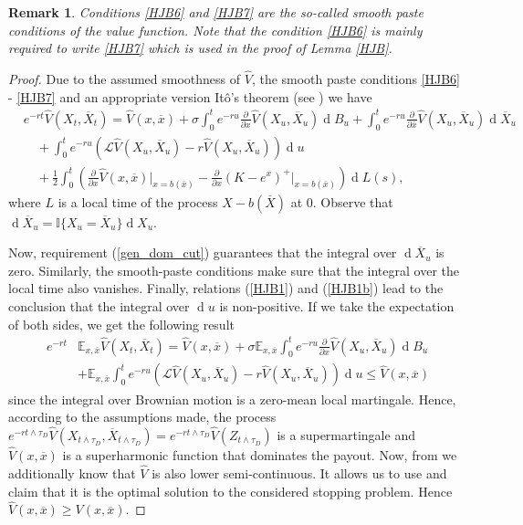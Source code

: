 \documentclass[10pt]{amsart}
\def\E{{\mathbb{E}}}
\def \R{{{\rm I{\!}\rm R}}}
\def \I{{\mathbb{I}}}
\newcommand{\dx}{\operatorname{d}\!}
\def\E{{\mathbb E}} \def\PP{\mc P} \def\Z{{\mathbb Z}} \def\R{{\mathbb R}}
\newtheorem{Rem}{Remark} \newtheorem{Exc}{Exercise}
\begin{document}
	\begin{Rem}
		\rm Conditions \eqref{HJB6} and \eqref{HJB7} are the so-called smooth paste conditions of the value function. Note that the condition \eqref{HJB6} is mainly required
		to write \eqref{HJB7} which is used in the proof of Lemma \ref{HJB}.
	\end{Rem}
	\begin{proof}
		Due to the assumed smoothness of $\hat{V}$, the smooth paste conditions \eqref{HJB6} - \eqref{HJB7} and an appropriate version It\^{o}'s theorem
		(see \cite[p. 208]{EisenbaumKyprianou}) we have
		\begin{align*}
			&e^{-rt}\hat{V}(X_t, \overline{X}_t) =
			\hat{V}(x,\overline{x}) + \sigma\int_0^t e^{-r u} \frac{\partial}{\partial x} \hat{V}(X_u, \overline{X}_u) \dx B_u + \int_0^t e^{-r u} \frac{\partial}{\partial \overline{x}} \hat{V}(X_u, \overline{X}_u) \dx \overline{X}_u \nonumber\\
			&\quad + \int_0^t e^{-r u} \left( \mathcal{L}\hat{V}(X_u, \overline{X}_u) - r\hat{V}(X_u, \overline{X}_u) \right) \dx u\\&\quad  +\frac{1}{2}
			\int_0^t \left( \frac{\partial}{\partial x} \hat{V}(x, \overline{x}) \big|_{x = b(\overline{x})} - \frac{\partial}{\partial x} (K - e^x)^+ \big|_{x = b(\overline{x})}\right)\dx L(s), \nonumber
		\end{align*}
		where $L$ is a local time of the process $X - b(\overline{X})$ at 0. Observe that $\dx \overline{X}_u = \I\{ X_u = \overline{X}_u \}\dx X_u$.
		
		Now, requirement (\ref{gen_dom_cut}) guarantees that the integral over $\dx \overline{X}_u$ is zero. Similarly, the smooth-paste conditions make sure that the integral over the local time also vanishes. Finally, relations (\ref{HJB1}) and (\ref{HJB1b}) lead to the conclusion that the integral over $\dx u$ is non-positive. If we take the expectation of both sides, we get the following result
		\begin{align*}
			e^{-rt}&\E_{x,\overline{x}}\hat{V}(X_t, \overline{X}_t) = \hat{V}(x,\overline{x}) + \sigma \E_{x,\overline{x}} \int_0^t e^{-r u} \frac{\partial}{\partial x} \hat{V}(X_u, \overline{X}_u) \dx B_u \\
			&+  \E_{x,\overline{x}} \int_0^t e^{-r u} \left( \mathcal{L}\hat{V}(X_u, \overline{X}_u) - r\hat{V}(X_u, \overline{X}_u) \right) \dx u \leq \hat{V}(x,\overline{x})
		\end{align*}
		since the integral over Brownian motion is a zero-mean local martingale. Hence, according to the assumptions made, the process $e^{-rt\wedge \tau_D}\hat{V}(X_{t\wedge \tau_D}, \overline{X}_{t\wedge \tau_D})=e^{-rt\wedge \tau_D}\hat{V}(Z_{t\wedge \tau_D})$ is a supermartingale and $\hat{V}(x,\overline{x})$ is a superharmonic function that dominates the payout. Now, from \cite[(2.2.80), p. 49]{PS} we additionally know that $\hat{V}$ is also lower semi-continuous. It allows us to use \cite[Thm. 2.7, p. 40]{PS} and claim that it is the optimal solution to the considered stopping problem. Hence $\hat{V}(x, \overline{x})\geq V(x, \overline{x})$.
	\end{proof}
\end{document}
